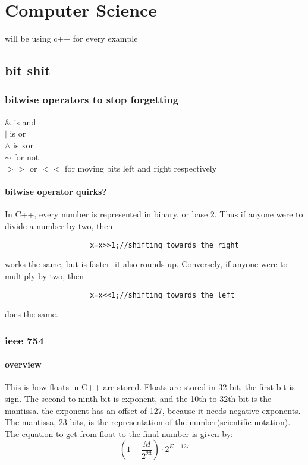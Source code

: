 \documentclass{article} %
\begin{document}
\section{Computer Science}\label{Computer Science}
will be using c++ for every example
    \subsection{bit shit}
        \subsubsection{bitwise operators to stop forgetting}
            \begin{center}
                \& is and\\$|$ is or\\$\wedge$ is xor\\$\sim$ for not\\$>>$ or $<<$ for moving bits left and right respectively
            \end{center}
            \paragraph{bitwise operator quirks?}
                In C++, every number is represented in binary, or base 2. Thus if anyone were to divide a number by two, then
                \begin{verbatim}
                    x=x>>1;//shifting towards the right
                \end{verbatim}
                works the same, but is faster. it also rounds up. Conversely, if anyone were to multiply by two, then 
                \begin{verbatim}
                    x=x<<1;//shifting towards the left
                \end{verbatim}
                does the same.
        \subsubsection{ieee 754}
            \paragraph{overview}
                This is how floats in C++ are stored. Floats are stored in 32 bit. the first bit is sign.
                The second to ninth bit is exponent, and the 10th to 32th bit is the mantissa. the exponent has
                an offset of 127, because it needs negative exponents. The mantissa, 23 bits, is the representation of the number(scientific notation).
                The equation to get from float to the final number is given by:
                \begin{equation}
                    (1+\dfrac{M}{2^{23}})\cdot2^{E-127}
                \end{equation}
\end{document}
